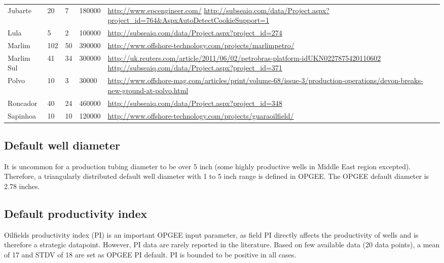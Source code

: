 \documentclass[11pt]{report}
\begin{document}
\begin{landscape}
\begin{table}
\begin{scriptsize}
\begin{tabular*}{1\columnwidth}{p{}p{}p{}p{}p{}}
Jubarte &20 &7 &180000 &\url{http://www.epcengineer.com/}
\url{http://subseaiq.com/data/Project.aspx?project_id=764&AspxAutoDetectCookieSupport=1} \\
Lula &5 &2 &100000 &\url{http://subseaiq.com/data/Project.aspx?project_id=274} \\
Marlim &102 &50 &390000 &\url{http://www.offshore-technology.com/projects/marlimpetro/} \\
Marlim Sul &41 &34 &300000 &\url{http://uk.reuters.com/article/2011/06/02/petrobras-platform-idUKN0227875420110602} 
\url{http://subseaiq.com/data/Project.aspx?project_id=371} \\
Polvo &10 &3 &30000 &\url{http://www.offshore-mag.com/articles/print/volume-68/issue-3/production-operations/devon-breaks-new-ground-at-polvo.html} \\
Roncador &40 &24 &460000 & \url{http://subseaiq.com/data/Project.aspx?project_id=348} \\
Sapinhoa &10 &10 &120000 & \url{http://www.offshore-technology.com/projects/guaraoilfield/} \\
\bottomrule
\end{tabular*}
\end{scriptsize}
\end{table}
\end{landscape}

\subsection{Default well diameter}
It is uncommon for a production tubing diameter to be over 5 inch (some highly productive wells in Middle East region excepted). Therefore, a triangularly distributed default well diameter with 1 to 5 inch range is defined in OPGEE. The OPGEE default diameter is 2.78 inches.   

\subsection{Default productivity index}
Oilfields productivity index (PI) is an important OPGEE input parameter, as field PI directly affects the productivity of wells and is therefore a strategic datapoint. However, PI data are rarely reported in the literature. Based on few available data (20 data points), a mean of 17 and STDV of 18 are set as OPGEE PI default. PI is bounded to be positive in all cases.  
\end{document}
